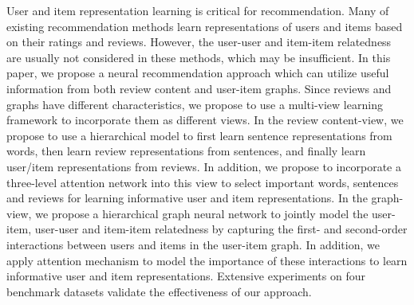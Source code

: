 User and item representation learning is critical for recommendation. Many of existing recommendation methods learn representations of users and items based on their  ratings and reviews. However, the user-user and item-item relatedness are usually not considered in these methods, which may be insufficient. In this paper, we propose a neural recommendation approach which can utilize useful information from both review content and user-item graphs. Since reviews and graphs have different characteristics, we propose to use a multi-view learning framework to incorporate them as different views. In the review content-view, we propose to use a hierarchical model to first learn sentence representations from words, then learn review representations from sentences, and finally learn user/item representations from reviews. In addition, we propose to incorporate a three-level attention network into this view to select important words, sentences and reviews for learning informative user and item representations. In the graph-view, we propose a hierarchical graph neural network to jointly model the user-item, user-user and item-item relatedness by capturing the first- and second-order interactions between users and items in the user-item graph. In addition, we apply attention mechanism to model the importance of these interactions to learn informative user and item representations.
Extensive experiments on four benchmark datasets validate the effectiveness of our approach.